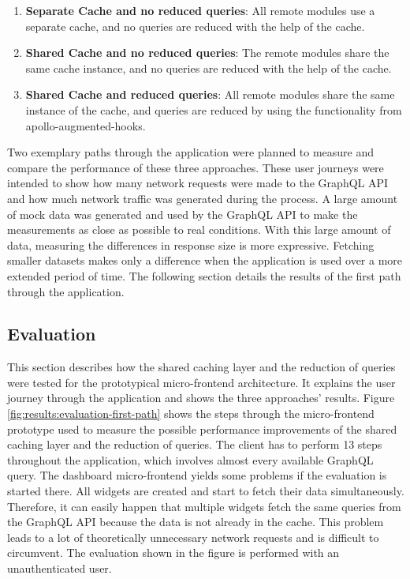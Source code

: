 \begin{enumerate}
  \item \textbf{Separate Cache and no reduced queries}: All remote modules use a separate cache, and no queries are reduced with the help of the cache.
  \item \textbf{Shared Cache and no reduced queries}: The remote modules share the same cache instance, and no queries are reduced with the help of the cache.
  \item \textbf{Shared Cache and reduced queries}: All remote modules share the same instance of the cache, and queries are reduced by using the functionality from apollo-augmented-hooks.
\end{enumerate}

\noindent Two exemplary paths through the application were planned to measure and compare the performance of these three approaches. These user journeys were intended to show how many network requests were made to the GraphQL \ac{API} and how much network traffic was generated during the process. A large amount of mock data was generated and used by the GraphQL \ac{API} to make the measurements as close as possible to real conditions. With this large amount of data, measuring the differences in response size is more expressive. Fetching smaller datasets makes only a difference when the application is used over a more extended period of time. The following section details the results of the first path through the application.

\subsection{Evaluation}\label{subsection:results:performance-measurement:evaluation}

This section describes how the shared caching layer and the reduction of queries were tested for the prototypical micro-frontend architecture. It explains the user journey through the application and shows the three approaches' results. Figure \ref{fig:results:evaluation-first-path} shows the steps through the micro-frontend prototype used to measure the possible performance improvements of the shared caching layer and the reduction of queries. The client has to perform 13 steps throughout the application, which involves almost every available GraphQL query. The dashboard micro-frontend yields some problems if the evaluation is started there. All widgets are created and start to fetch their data simultaneously. Therefore, it can easily happen that multiple widgets fetch the same queries from the GraphQL \ac{API} because the data is not already in the cache. This problem leads to a lot of theoretically unnecessary network requests and is difficult to circumvent. The evaluation shown in the figure is performed with an unauthenticated user.

